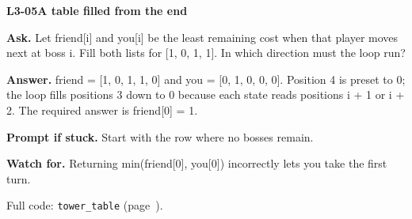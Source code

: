 \documentclass[11pt,a4paper]{article}
\begin{document}
\noindent\begin{minipage}{\textwidth}
{\color{teal}\textbf{L3-05}}\quad \textbf{A table filled from the end}\par\smallskip
\textbf{Ask.} Let friend[i] and you[i] be the least remaining cost when that player moves next at boss i. Fill both lists for [1, 0, 1, 1]. In which direction must the loop run?\par\smallskip
\textbf{Answer.} friend = [1, 0, 1, 1, 0] and you = [0, 1, 0, 0, 0]. Position 4 is preset to 0; the loop fills positions 3 down to 0 because each state reads positions i + 1 or i + 2. The required answer is friend[0] = 1.\par\smallskip
\textbf{Prompt if stuck.} Start with the row where no bosses remain.\par\smallskip
\textbf{Watch for.} Returning min(friend[0], you[0]) incorrectly lets you take the first turn.\par\smallskip Full code: \texttt{tower\_table} (page~\pageref{L3-code-tower_table}).
\end{minipage}\par{}\medskip
\end{document}
